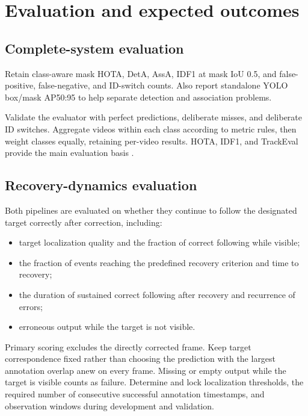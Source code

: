 \documentclass{article}
\begin{document}
\section{Evaluation and expected outcomes}

\subsection{Complete-system evaluation}

Retain class-aware mask HOTA, DetA, AssA, IDF1 at mask IoU 0.5, and false-positive, false-negative, and ID-switch counts. Also report standalone YOLO box/mask AP50:95 to help separate detection and association problems.

Validate the evaluator with perfect predictions, deliberate misses, and deliberate ID switches. Aggregate videos within each class according to metric rules, then weight classes equally, retaining per-video results. HOTA, IDF1, and TrackEval provide the main evaluation basis \citep{luiten2020,ristani2016,trackeval2020}.

\subsection{Recovery-dynamics evaluation}

Both pipelines are evaluated on whether they continue to follow the designated target correctly after correction, including:

\begin{itemize}

\item target localization quality and the fraction of correct following while visible;

\item the fraction of events reaching the predefined recovery criterion and time to recovery;

\item the duration of sustained correct following after recovery and recurrence of errors;

\item erroneous output while the target is not visible.

\end{itemize}

Primary scoring excludes the directly corrected frame. Keep target correspondence fixed rather than choosing the prediction with the largest annotation overlap anew on every frame. Missing or empty output while the target is visible counts as failure. Determine and lock localization thresholds, the required number of consecutive successful annotation timestamps, and observation windows during development and validation.
\end{document}
